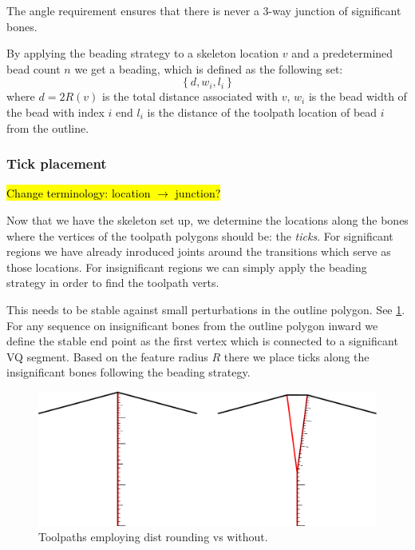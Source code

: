The angle requirement ensures that there is never a 3-way junction of significant bones.

By applying the beading strategy to a skeleton location $v$ and a predetermined bead count $n$ we get a beading, which is defined as the following set:
$$
\left\{ d, w_i, l_i  \right\}
$$
where
$d = 2 R(v)$ is the total distance associated with $v$,
$w_i$ is the bead width of the bead with index $i$
end
$l_i$ is the distance of the toolpath location of bead $i$ from the outline.



\subsubsection{Tick placement}
\hl{Change terminology: location $\to$ junction?}

Now that we have the skeleton set up, we determine the locations along the bones where the vertices of the toolpath polygons should be: the \emph{ticks}.
For significant regions we have already inroduced joints around the transitions which serve as those locations.
For insignificant regions we can simply apply the beading strategy in order to find the toolpath verts.


This needs to be stable against small perturbations in the outline polygon.
See \cref{heterogeneous_joint_generation}.
For any sequence on insignificant bones from the outline polygon inward we define the stable end point as the first vertex which is connected to a significant VQ segment.
Based on the feature radius $R$ there we place ticks along the insignificant bones following the beading strategy.

\begin{figure}
\includegraphics[width=\columnwidth]{sources/method/heterogeneous_joint_generation.pdf}
\caption{Toolpaths employing dist rounding vs without.}
\label{heterogeneous_joint_generation}
\end{figure}





